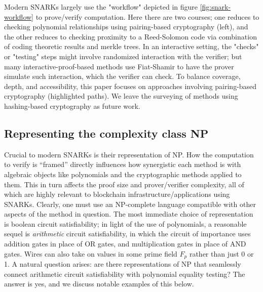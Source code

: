\noindent Modern SNARKs largely use the "workflow" depicted in figure \ref{fig:snark-workflow} to prove/verify computation. Here there are two courses; one reduces to checking polynomial relationships using pairing-based cryptography (left), and the other reduces to checking proximity to a Reed-Solomon code via combination of coding theoretic results and merkle trees. In an interactive setting, the "checks" or "testing" steps might involve randomized interaction with the verifier; but many interactive-proof-based methods use Fiat-Shamir to have the prover simulate such interaction, which the verifier can check. To balance coverage, depth, and accessibility, this paper focuses on approaches involving pairing-based cryptography (highlighted paths). We leave the surveying of methods using hashing-based cryptography as future work.

\subsection{Representing the complexity class NP}
\noindent Crucial to modern SNARKs is their representation of NP. How the computation to verify is ``framed'' directly influences how synergistic each method is with algebraic objects like polynomials and the cryptographic methods applied to them. This in turn affects the proof size and prover/verifier complexity, all of which are highly relevant to blockchain infrastructure/applications using SNARKs. Clearly, one must use an NP-complete language compatible with other aspects of the method in question. The most immediate choice of representation is boolean circuit satisfiability; in light of the use of polynomials, a reasonable sequel is \textit{arithmetic} circuit satisfiability, in which the circuit of importance uses addition gates in place of OR gates, and multiplication gates in place of AND gates. Wires can also take on values in some prime field $F_p$  rather than just 0 or 1. A natural question arises: are there representations of NP that seamlessly connect arithmetic circuit satisfiability with polynomial equality testing? The answer is yes, and we discuss notable examples of this below.

